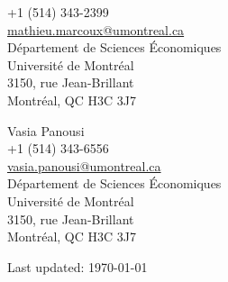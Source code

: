 \documentclass[margin,line]{res}
\begin{document}
\begin{resume}
\begin{minipage}{0.45\resumewidth}
  +1 (514) 343-2399                                                                       \\
  \href{mailto:mathieu.marcoux@umontreal.ca}{mathieu.marcoux@umontreal.ca}                \\
  D\'epartement de Sciences \'Economiques                                                 \\
  Universit\'e de Montr\'eal                                                              \\
  3150, rue Jean-Brillant                                                                 \\
  Montr\'eal, QC  H3C 3J7                                                                 \\
\end{minipage}
\begin{minipage}{0.45\resumewidth}
  Vasia Panousi                                                                           \\
  +1 (514) 343-6556                                                                       \\
  \href{mailto:vasia.panousi@umontreal.ca}{vasia.panousi@umontreal.ca}                    \\
  D\'epartement de Sciences \'Economiques                                                 \\
  Universit\'e de Montr\'eal                                                              \\
  3150, rue Jean-Brillant                                                                 \\
  Montr\'eal, QC  H3C 3J7                                                                 \\
\end{minipage}
     
\end{resume}

\vspace{0.5in}
\hfill {\footnotesize Last updated: \today}
\end{document}

